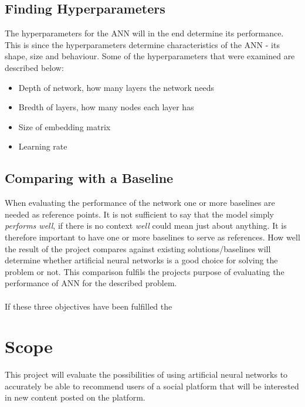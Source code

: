 \subsection{Finding Hyperparameters}
The hyperparameters for the ANN will in the end determine its performance. This is since the hyperparameters determine characteristics of the ANN - its shape, size and behaviour. Some of the hyperparameters that were  examined are described below:
\vspace*{0.25cm}
\begin{itemize}
    \item Depth of network, how many layers the network needs
    \item Bredth of layers, how many nodes each layer has
    \item Size of embedding matrix
    \item Learning rate
\end{itemize}

\subsection{Comparing with a Baseline}
When evaluating the performance of the network one or more baselines are needed as reference points. It is not sufficient to say that the model simply \textit{performs well}, if there is no context \textit{well} could mean just about anything. It is therefore important to have one or more baselines to serve as references. How well the result of the project compares against existing solutions/baselines will determine whether artificial neural networks is a good choice for solving the problem or not. This comparison fulfils the projects purpose of evaluating the performance of ANN for the described problem.
\\\\
If these three objectives have been fulfilled the 

\section{Scope}
This project will evaluate the possibilities of using artificial neural networks to accurately be able to recommend users of a social platform that will be interested in new content posted on the platform.


